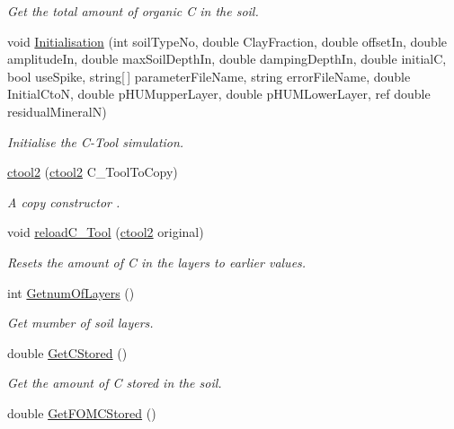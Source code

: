 \begin{DoxyCompactItemize}
\begin{DoxyCompactList}\small\item\em Get the total amount of organic C in the soil. \end{DoxyCompactList}\item 
void \mbox{\hyperlink{classctool2_ad657aea1170e4929c7b96709f319f41c}{Initialisation}} (int soil\+Type\+No, double Clay\+Fraction, double offset\+In, double amplitude\+In, double max\+Soil\+Depth\+In, double damping\+Depth\+In, double initialC, bool use\+Spike, string\mbox{[}$\,$\mbox{]} parameter\+File\+Name, string error\+File\+Name, double Initial\+CtoN, double p\+H\+U\+Mupper\+Layer, double p\+H\+U\+M\+Lower\+Layer, ref double residual\+MineralN)
\begin{DoxyCompactList}\small\item\em Initialise the C-\/\+Tool simulation. \end{DoxyCompactList}\item 
\mbox{\hyperlink{classctool2_aa42611f6b7b54168648f5b7896157e51}{ctool2}} (\mbox{\hyperlink{classctool2}{ctool2}} C\+\_\+\+Tool\+To\+Copy)
\begin{DoxyCompactList}\small\item\em A copy constructor . \end{DoxyCompactList}\item 
void \mbox{\hyperlink{classctool2_a463a13b4941af48d351824a9b4a5e400}{reload\+C\+\_\+\+Tool}} (\mbox{\hyperlink{classctool2}{ctool2}} original)
\begin{DoxyCompactList}\small\item\em Resets the amount of C in the layers to earlier values. \end{DoxyCompactList}\item 
int \mbox{\hyperlink{classctool2_ab86d9eac33a5b0e729a9c08e62ce2cac}{Getnum\+Of\+Layers}} ()
\begin{DoxyCompactList}\small\item\em Get mumber of soil layers. \end{DoxyCompactList}\item 
double \mbox{\hyperlink{classctool2_a4002bf436d8ceb479203d186315a66e9}{Get\+C\+Stored}} ()
\begin{DoxyCompactList}\small\item\em Get the amount of C stored in the soil. \end{DoxyCompactList}\item 
double \mbox{\hyperlink{classctool2_a64472639343da0e7e753a2b5f169468e}{Get\+F\+O\+M\+C\+Stored}} ()

\end{DoxyCompactItemize}
